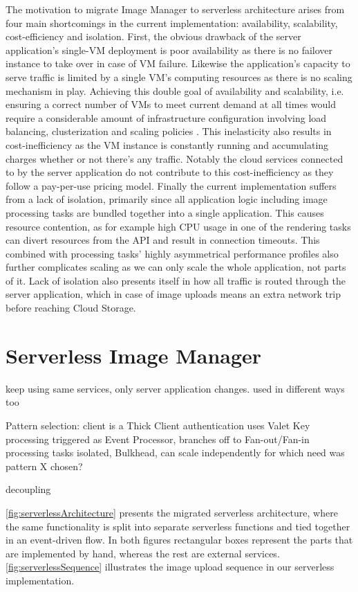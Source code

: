 The motivation to migrate Image Manager to serverless architecture arises from four main shortcomings in the current implementation: availability, scalability, cost-efficiency and isolation. First, the obvious drawback of the server application's single-VM deployment is poor availability as there is no failover instance to take over in case of VM failure. Likewise the application's capacity to serve traffic is limited by a single VM's computing resources as there is no scaling mechanism in play. Achieving this double goal of availability and scalability, i.e. ensuring a correct number of VMs to meet current demand at all times would require a considerable amount of infrastructure configuration involving load balancing, clusterization and scaling policies \parencite{jonas19berkeleyView}. This inelasticity also results in cost-inefficiency as the VM instance is constantly running and accumulating charges whether or not there's any traffic. Notably the cloud services connected to by the server application do not contribute to this cost-inefficiency as they follow a pay-per-use pricing model. Finally the current implementation suffers from a lack of isolation, primarily since all application logic including image processing tasks are bundled together into a single application. This causes resource contention, as for example high CPU usage in one of the rendering tasks can divert resources from the API and result in connection timeouts. This combined with processing tasks' highly asymmetrical performance profiles also further complicates scaling as we can only scale the whole application, not parts of it. Lack of isolation also presents itself in how all traffic is routed through the server application, which in case of image uploads means an extra network trip before reaching Cloud Storage.

\section{Serverless Image Manager}

keep using same services, only server application changes. used in different ways too

Pattern selection:
client is a Thick Client
authentication uses Valet Key
processing triggered as Event Processor, branches off to Fan-out/Fan-in
processing tasks isolated, Bulkhead, can scale independently
for which need was pattern X chosen?

decoupling

\ref{fig:serverlessArchitecture} presents the migrated serverless architecture, where the same functionality is split into separate serverless functions and tied together in an event-driven flow. In both figures rectangular boxes represent the parts that are implemented by hand, whereas the rest are external services. \ref{fig:serverlessSequence} illustrates the image upload sequence in our serverless implementation.

